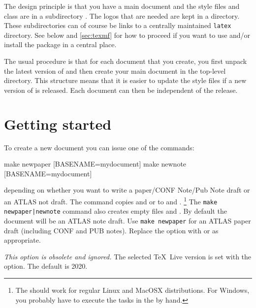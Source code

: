 The design principle is that you have a main document and 
the style files and  class are in a subdirectory .
The logos that are needed are kept in a  directory.
These subdirectories can of course be links to a centrally maintained \texttt{latex} directory.
See below and \cref{sec:texmf} for how to proceed if you want to use and/or install
the package in a central place.

The usual procedure is that for each document that you create,
you first unpack the latest version of  and
then create your main document in the top-level directory.
This structure means that it is easier to update the style files if a new version of
 is released. 
Each document can then be independent of the  release.

\section{Getting started}

To create a new document you can issue one of the commands:
%
\begin{bashlisting}
make newpaper [BASENAME=mydocument]
make newnote [BASENAME=mydocument]
\end{bashlisting}
depending on whether you want to write a paper/CONF Note/Pub Note draft or
an ATLAS not draft.
%
The command copies  and
 or 
to  and .%
\footnote{The  should work for regular Linux and MacOSX distributions.
For Windows, you probably have to execute the tasks in the  by hand.}
The \texttt{make newpaper|newnote} command also creates empty files  and .
By default the document will be an ATLAS note draft.
Use \texttt{make newpaper} for an ATLAS paper draft (including CONF and PUB notes).
Replace the option  with  or  as appropriate.

\emph{ This  option is obsolete and ignored.}
The selected \TeX\ Live version is set with the  option. The default is 2020.

